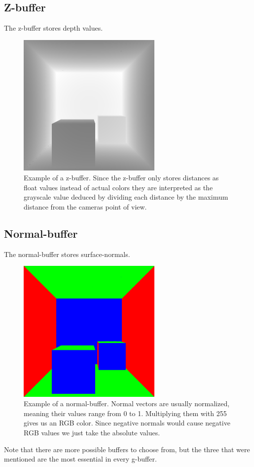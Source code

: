 \documentclass{ACGSeminar}
\begin{document}
	\subsection{Z-buffer}
		The z-buffer stores depth values.
		\begin{figure}[htb!]%
			\begin{center}%
				\includegraphics[width=7cm]{img/z_buffer.png}
			\end{center}%
			\caption{Example of a z-buffer. Since the z-buffer only stores distances as float values instead of actual colors they are interpreted as the grayscale value deduced by dividing each
			distance by the maximum distance from the cameras point of view.}%
			\label{fig:z_buffer}%
		\end{figure}%
	\subsection{Normal-buffer}
		The normal-buffer stores surface-normals.
		\begin{figure}[htb!]%
			\begin{center}%
				\includegraphics[width=7cm]{img/normal_buffer.png}
			\end{center}%
			\caption{Example of a normal-buffer. Normal vectors are usually normalized, meaning their values range from 0 to 1. Multiplying them with 255 gives us an RGB color. Since negative normals
			would cause negative RGB values we just take the absolute values.}%
			\label{fig:normal_buffer}%
		\end{figure}%
		Note that there are more possible buffers to choose from, but the three that were mentioned are the most essential in every g-buffer.
\end{document}

